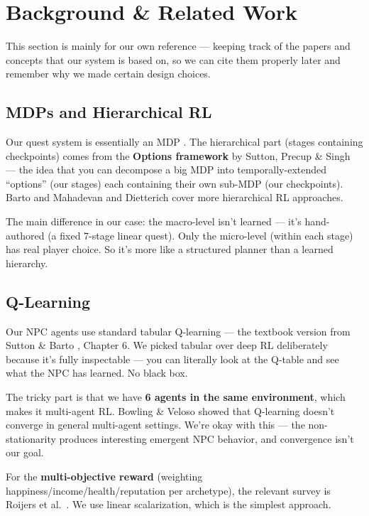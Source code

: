 \section{Background \& Related Work}
\label{sec:related_work}

This section is mainly for our own reference --- keeping track of the papers and concepts that our system is based on, so we can cite them properly later and remember why we made certain design choices.

\subsection{MDPs and Hierarchical RL}

Our quest system is essentially an MDP \cite{bellman1957dynamic, puterman1994mdp}. The hierarchical part (stages containing checkpoints) comes from the \textbf{Options framework} by Sutton, Precup \& Singh \cite{sutton1999options} --- the idea that you can decompose a big MDP into temporally-extended ``options'' (our stages) each containing their own sub-MDP (our checkpoints). Barto and Mahadevan \cite{barto2003hierarchical} and Dietterich \cite{dietterich2000maxq} cover more hierarchical RL approaches.

The main difference in our case: the macro-level isn't learned --- it's hand-authored (a fixed 7-stage linear quest). Only the micro-level (within each stage) has real player choice. So it's more like a structured planner than a learned hierarchy.

\subsection{Q-Learning}

Our NPC agents use standard tabular Q-learning \cite{watkins1989learning, watkins1992qlearning} --- the textbook version from Sutton \& Barto \cite{sutton2018rl}, Chapter 6. We picked tabular over deep RL deliberately because it's fully inspectable --- you can literally look at the Q-table and see what the NPC has learned. No black box.

The tricky part is that we have \textbf{6 agents in the same environment}, which makes it multi-agent RL. Bowling \& Veloso \cite{bowling2002multiagent} showed that Q-learning doesn't converge in general multi-agent settings. We're okay with this --- the non-stationarity produces interesting emergent NPC behavior, and convergence isn't our goal.

For the \textbf{multi-objective reward} (weighting happiness/income/health/reputation per archetype), the relevant survey is Roijers et al.\ \cite{roijers2013morl}. We use linear scalarization, which is the simplest approach.

